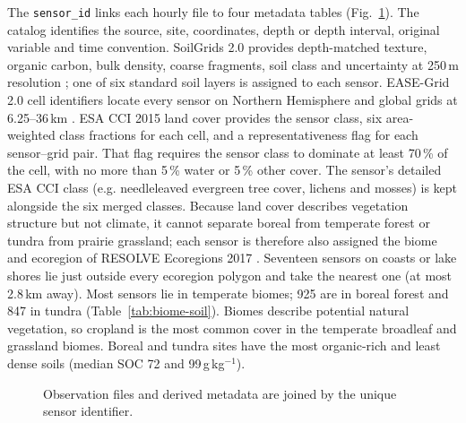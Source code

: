 \documentclass[essd,manuscript]{copernicus}
\begin{document}
The \texttt{sensor\_id} links each hourly file to four metadata tables
(Fig.~\ref{fig:metadata}). The catalog identifies the source, site, coordinates,
depth or depth interval, original variable and time convention. SoilGrids 2.0
provides depth-matched texture, organic carbon, bulk density, coarse fragments,
soil class and uncertainty at 250\,m resolution \citep{poggio2021}; one of six
standard soil layers is assigned to each sensor. EASE-Grid 2.0 cell identifiers
locate every sensor on Northern Hemisphere and global grids at 6.25--36\,km
\citep{brodzik2012}. ESA CCI 2015 land cover provides the sensor class, six
area-weighted class fractions for each cell, and a representativeness flag for
each sensor--grid pair. That flag requires the sensor class to dominate at
least 70\,\% of the cell, with no more than 5\,\% water or 5\,\% other cover.
The sensor's detailed ESA CCI class (e.g. needleleaved evergreen tree cover,
lichens and mosses) is kept alongside the six merged classes. Because land
cover describes vegetation structure but not climate, it cannot separate
boreal from temperate forest or tundra from prairie grassland; each sensor is
therefore also assigned the biome and ecoregion of RESOLVE Ecoregions 2017
\citep{dinerstein2017}. Seventeen sensors on coasts or lake shores lie just
outside every ecoregion polygon and take the nearest one (at most 2.8\,km
away). Most sensors lie in temperate biomes; 925 are in boreal forest and 847 in
tundra (Table~\ref{tab:biome-soil}). Biomes describe potential natural
vegetation, so cropland is the most common cover in the temperate broadleaf
and grassland biomes. Boreal and tundra sites have the most organic-rich and
least dense soils (median SOC 72 and 99\,g\,kg$^{-1}$).



\begin{figure}[t]
\centering
{}
\caption{Observation files and derived metadata are joined by the unique sensor identifier.}
\label{fig:metadata}
\end{figure}
\end{document}
